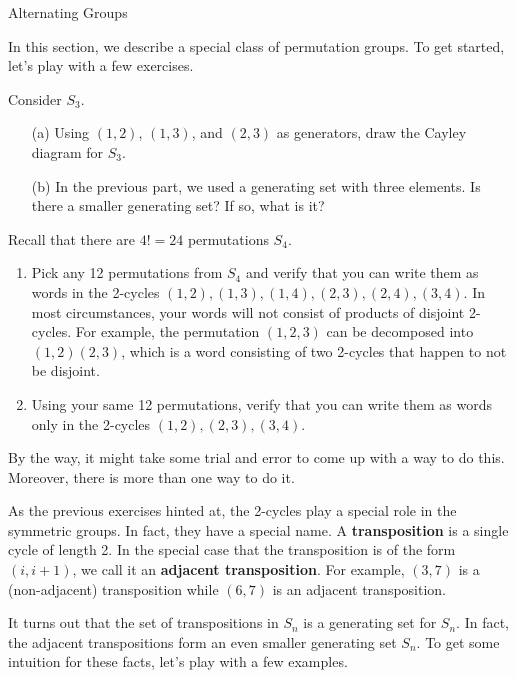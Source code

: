 \begin{section}{Alternating Groups}

In this section, we describe a special class of permutation groups.  To get started, let's play with a few exercises.

\begin{exercise}
Consider $S_3$.
\begin{enumerate}
\item[(a)] Using $(1,2)$, $(1,3)$, and $(2,3)$ as generators, draw the Cayley diagram for $S_3$.
\item[(b)] In the previous part, we used a generating set with three elements.  Is there a smaller generating set?  If so, what is it?
\end{enumerate}
\end{exercise}

\begin{exercise}
Recall that there are $4!=24$ permutations $S_4$.    
\begin{enumerate}[label=\rm{(\alph*)}]
\item Pick any 12 permutations from $S_4$ and verify that you can write them as words in the 2-cycles $(1,2), (1,3), (1,4), (2,3), (2,4),(3,4)$.  In most circumstances, your words will not consist of products of disjoint 2-cycles.  For example, the permutation $(1,2,3)$ can be decomposed into $(1,2)(2,3)$, which is a word consisting of two 2-cycles that happen to not be disjoint.
\item Using your same 12 permutations, verify that you can write them as words only in the 2-cycles $(1,2),(2,3),(3,4)$.
\end{enumerate}
By the way, it might take some trial and error to come up with a way to do this.  Moreover, there is more than one way to do it.
\end{exercise}

As the previous exercises hinted at, the 2-cycles play a special role in the symmetric groups.  In fact, they have a special name.  A \textbf{transposition} is a single cycle of length 2.  In the special case that the transposition is of the form $(i,i+1)$, we call it an \textbf{adjacent transposition}.  For example, $(3,7)$ is a (non-adjacent) transposition while $(6,7)$ is an adjacent transposition.

It turns out that the set of transpositions in $S_n$ is a generating set for $S_n$.  In fact, the adjacent transpositions form an even smaller generating set $S_n$.  To get some intuition for these facts, let's play with a few examples.


\end{section}
